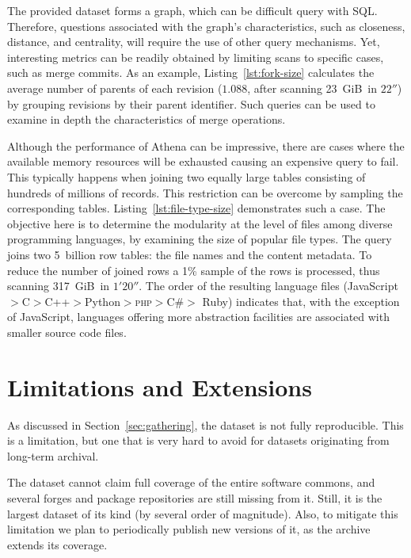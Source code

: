 

The provided dataset forms a graph, which can be difficult query with SQL.
Therefore, questions associated with the graph's characteristics,
such as closeness, distance, and centrality, will require the use of
other query mechanisms.
Yet, interesting metrics can be readily obtained by limiting scans
to specific cases, such as merge commits.
As an example, Listing~\ref{lst:fork-size} calculates the average
number of parents of each revision ($1.088$, after scanning 23~GiB\ in $22''$)
by grouping revisions by their parent identifier.
Such queries can be used to examine in depth the characteristics
of merge operations.



Although the performance of Athena can be impressive,
there are cases where the available memory resources will be exhausted
causing an expensive query to fail.
This typically happens when joining two equally large tables consisting
of hundreds of millions of records.
This restriction can be overcome by sampling the corresponding tables.
Listing~\ref{lst:file-type-size} demonstrates such a case.
The objective here is to determine the modularity at the level of files among
diverse programming languages, by examining the size of popular file types.
The query joins two 5~billion row tables:
the file names and the content metadata.
To reduce the number of joined rows a 1\% sample of the rows is processed,
thus scanning 317~GiB\ in $1'20''$.
The order of the resulting language files
(JavaScript$>$C$>$C++$>$Python$>$\textsc{php}$>$C\#$>$ Ruby)
indicates that,
with the exception of JavaScript,
languages offering more abstraction facilities are associated with
smaller source code files.


\section{Limitations and Extensions}
\label{sec:threats}

As discussed in Section~\ref{sec:gathering}, the dataset is not fully
reproducible. This is a limitation, but one that is very hard to avoid for
datasets originating from long-term archival.

The dataset cannot claim full coverage of the entire software commons, and
several forges and package repositories are still missing from it. Still, it is
the largest dataset of its kind (by several order of magnitude). Also, to
mitigate this limitation we plan to periodically publish new versions of it, as
the \SWH archive extends its coverage.

